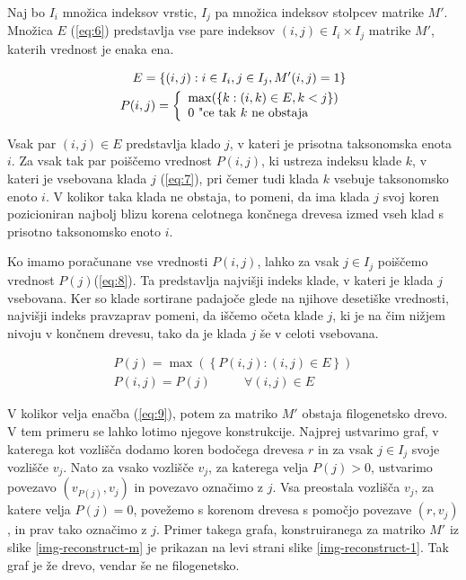 \documentclass[a4paper, 12pt]{book}
\begin{document}
Naj bo $I_i$ množica indeksov vrstic, $I_j$ pa množica indeksov stolpcev matrike $M'$. Množica $E$ (\ref{eq:6}) predstavlja vse pare indeksov $(i, j) \in I_i \times I_j$ matrike $M'$, katerih vrednost je enaka ena.

\begin{align}
	E = \left\{ {(i, j): i \in I_i, j \in I_j, M'(i, j) = 1} \right\} \label{eq:6} \\
	P(i, j) = 
		\left\{
		\begin{array}{ll}
			\max(\left\{k: (i, k) \in E, k < j\right\}) \\
			0 $      "ce tak $k$ ne obstaja$
		\end{array}
		\right.
	\label{eq:7}
\end{align}

Vsak par $(i, j) \in E$ predstavlja klado $j$, v kateri je prisotna taksonomska enota $i$. Za vsak tak par poiščemo vrednost $P(i, j)$, ki ustreza indeksu klade $k$, v kateri je vsebovana klada $j$ (\ref{eq:7}), pri čemer tudi klada $k$ vsebuje taksonomsko enoto $i$. V kolikor taka klada ne obstaja, to pomeni, da ima klada $j$ svoj koren pozicioniran najbolj blizu korena celotnega končnega drevesa izmed vseh klad s prisotno taksonomsko enoto $i$. 

Ko imamo poračunane vse vrednosti $P(i, j)$, lahko za vsak $j \in I_j$ poiščemo vrednost $P(j)$(\ref{eq:8}). Ta predstavlja najvišji indeks klade, v kateri je klada $j$ vsebovana. Ker so klade sortirane padajoče glede na njihove desetiške vrednosti, najvišji indeks pravzaprav pomeni, da iščemo očeta klade $j$, ki je na čim nižjem nivoju v končnem drevesu, tako da je klada $j$ še v celoti vsebovana.
	
\begin{align}
	P(j) = \max(\left\{P(i, j): (i, j) \in E\right\}) \label{eq:8} \\
	P(i, j) = P(j)   ~~~~~~~~~~~~  \forall (i, j) \in E \label{eq:9}
\end{align}

V kolikor velja enačba (\ref{eq:9}), potem za matriko $M'$ obstaja filogenetsko drevo\cite{gd}. V tem primeru se lahko lotimo njegove konstrukcije. Najprej ustvarimo graf, v katerega kot vozlišča dodamo koren bodočega drevesa $r$ in za vsak $j \in I_j$ svoje vozlišče $v_j$. Nato za vsako vozlišče $v_j$, za katerega velja $P(j) > 0$, ustvarimo povezavo $(v_{P(j)}, v_j)$ in povezavo označimo z $j$. Vsa preostala vozlišča $v_j$, za katere velja $P(j) = 0$, povežemo s korenom drevesa s pomočjo povezave $(r, v_j)$, in prav tako označimo z $j$. Primer takega grafa, konstruiranega za matriko $M'$ iz slike \ref{img-reconstruct-m} je prikazan na levi strani slike \ref{img-reconstruct-1}. Tak graf je že drevo, vendar še ne filogenetsko.
\end{document}
